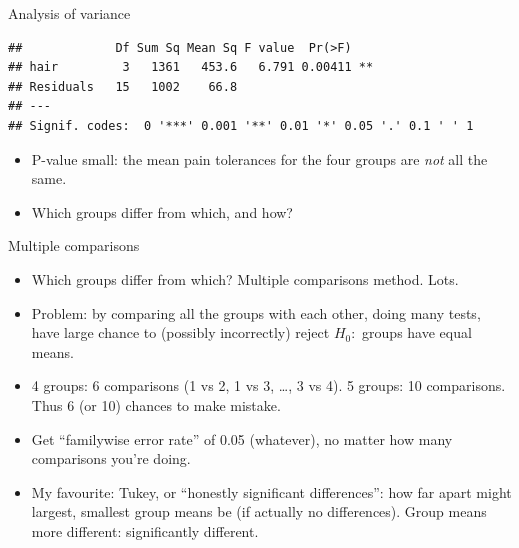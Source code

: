 \begin{frame}[fragile]{Analysis of variance}
\begin{knitrout}
\color{fgcolor}\begin{kframe}
\begin{alltt}
\hlkwb{=}\hlopt{~}
\end{alltt}
\begin{verbatim}
##             Df Sum Sq Mean Sq F value  Pr(>F)   
## hair         3   1361   453.6   6.791 0.00411 **
## Residuals   15   1002    66.8                   
## ---
## Signif. codes:  0 '***' 0.001 '**' 0.01 '*' 0.05 '.' 0.1 ' ' 1
\end{verbatim}
\end{kframe}
\end{knitrout}

\begin{itemize}
\item P-value small: the mean pain tolerances for the four groups are
  \emph{not} all the same.
\item Which groups differ from which, and how?
\end{itemize}
\end{frame}



\begin{frame}[fragile]{Multiple comparisons}

  \begin{itemize}
  \item Which groups differ from which? Multiple
    comparisons method. Lots.
  \item Problem: by comparing all the groups with each other, doing
    many tests, have large chance to (possibly incorrectly) reject
    $H_0:$ groups have equal means.
  \item 4 groups: 6 comparisons (1 vs 2, 1 vs 3, \ldots, 3 vs 4). 5 groups: 10
    comparisons. Thus 6 (or 10) chances to make mistake.
\item Get ``familywise error rate'' of 0.05 (whatever), no
matter how many comparisons you’re doing.
\item My favourite: Tukey, or ``honestly
  significant differences'': how far apart might largest, smallest
  group means be (if actually no differences). Group means more
  different: significantly different.
  \end{itemize}
\end{frame}

